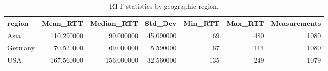 \begin{table}
\caption{RTT statistics by geographic region.}
\label{tab:rtt_stats}
\begin{tabular}{lrrrrrr}
\toprule
region & Mean_RTT & Median_RTT & Std_Dev & Min_RTT & Max_RTT & Measurements \\
\midrule
Asia & 110.290000 & 90.000000 & 45.090000 & 69 & 480 & 1080 \\
Germany & 70.520000 & 69.000000 & 5.590000 & 67 & 114 & 1080 \\
USA & 167.560000 & 156.000000 & 32.560000 & 135 & 249 & 1079 \\
\bottomrule
\end{tabular}
\end{table}
